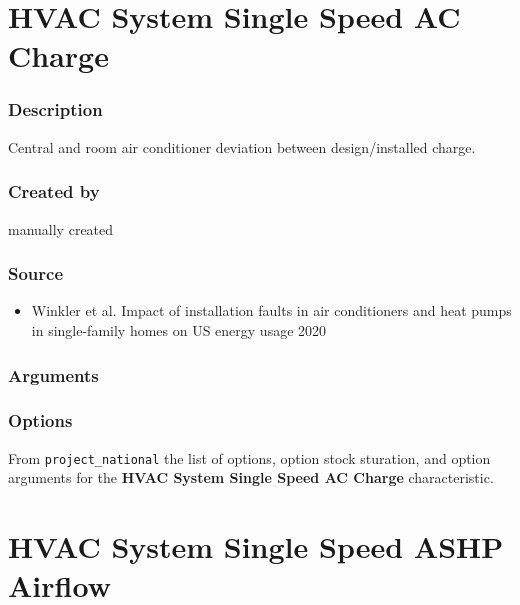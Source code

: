 \section{HVAC System Single Speed AC
Charge}\label{hvac_system_single_speed_ac_charge}

\subsubsection{Description}\label{description-82}

Central and room air conditioner deviation between design/installed
charge.

\subsubsection{Created by}\label{created-by-82}

manually created

\subsubsection{Source}\label{source-81}

\begin{itemize}
 
\item
  Winkler et al. \textquotesingle Impact of installation faults in air
  conditioners and heat pumps in single-family homes on US energy
  usage\textquotesingle{} 2020
\end{itemize}

\subsubsection{Arguments}\label{arguments-51}



\subsubsection{Options}\label{options-82}

From \texttt{project\_national} the list of options, option stock
sturation, and option arguments for the \textbf{HVAC System Single Speed
AC Charge} characteristic.



\section{HVAC System Single Speed ASHP
Airflow}\label{hvac_system_single_speed_ashp_airflow}


